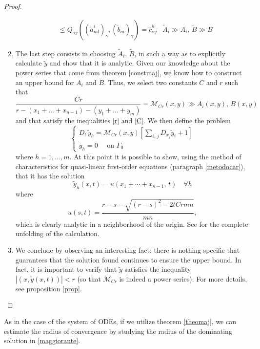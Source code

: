 \begin{proof}
\begin{enumerate}
\begin{align*}
&\leq Q_{\alpha j}\left((\widetilde{a}^i_{ml})_\gamma, (\widetilde{b}_m)_\gamma\right) = \widetilde{c}^h_{\alpha j}
& \widetilde{A}_i \gg A_i, \, \widetilde{B} \gg B
\end{align*}
\item The last step consists in choosing $\widetilde{A}_i, \, \widetilde{B}$, in such a way as to explicitly calculate $\widetilde{y}$ and show that it is analytic. Given our knowledge about the power series that come from theorem \ref{constmaj}, we know how to construct an upper bound for $A_i$ and $B$. Thus, we select two constants $C$ and $r$ such that 
$$\frac{Cr}{r-(x_1+\ldots +x_{n-1})-(y_1+\ldots +y_m)}=\mathcal{M}_{Cr}(x,y) \gg A_i(x,y),\, B(x,y)$$
and that satisfy the inequalities \eqref{r} and \eqref{C}. We then define the problem
\begin{equation*}
\begin{cases}
D_t \, \widetilde{y}_h = \mathcal{M}_{Cr} (x,y) \left[\sum\limits_{i,\, j} D_{x_j}\widetilde{y}_i+1 \right] \\ 
\widetilde{y_h}=0 \quad \text{ on } \Gamma_0
\end{cases}
\end{equation*}
where $h=1,\ldots, m$. At this point it is possible to show, using the method of characteristics for quasi-linear first-order equations (paragraph \ref{metodocar}), that it has the solution
\begin{equation}\label{maggiorante}
\widetilde{y}_h(x,t)=u(x_1+\cdots +x_{n-1},\,t) \quad \forall h
\end{equation}
where
\begin{equation}\label{sol}
u(s,t)=\frac{r-s-\sqrt{(r-s)^2-2tCrmn}}{mn},
\end{equation}
which is clearly analytic in a neighborhood of the origin. See \cite[cap.1]{Folland} for the complete unfolding of the calculation.
\item We conclude by observing an interesting fact: there is nothing specific that guarantees that the solution found continues to ensure the upper bound. In fact, it is important to verify that $\widetilde{y}$ satisfies the inequality $|(x,\widetilde{y}(x,t))|< r$ (so that $\mathcal{M}_{Cr}$ is indeed a power series). For more details, see proposition \ref{prop}.
\end{enumerate}
\end{proof}


\newpage
As in the case of the system of ODEs, if we utilize theorem \ref{theomaj}, we can estimate the radius of convergence by studying the radius of the dominating solution in \eqref{maggiorante}. 

